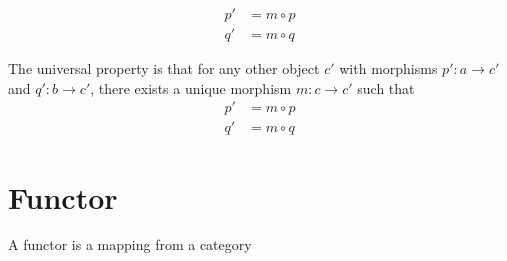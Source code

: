 \documentclass[a4paper]{article}
\begin{document}
\begin{minipage}{0.5\textwidth}
\end{minipage}
\begin{minipage}{0.5\textwidth}
    \begin{align*}
        p' &= m \circ p \\
        q' &= m \circ q
    \end{align*}
\end{minipage}

The universal property is that for any other object \(c'\)
with morphisms \(p':a \to c'\) and \(q':b \to c'\),
there exists a unique morphism \(m:c \to c'\)
such that
\begin{align*}
    p' &= m \circ p \\
    q' &= m \circ q
\end{align*}

\section{Functor}

A functor is a mapping from a category
\end{document}
